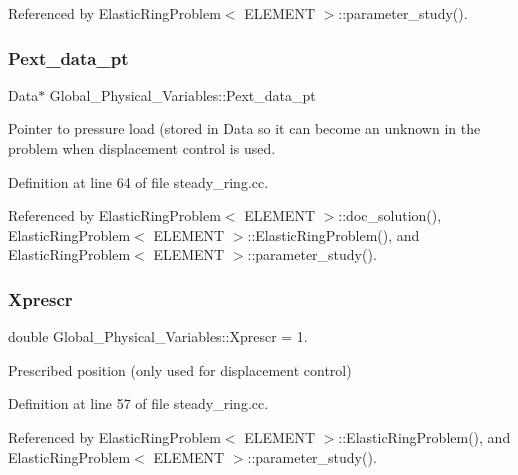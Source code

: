 Referenced by Elastic\+Ring\+Problem$<$ E\+L\+E\+M\+E\+N\+T $>$\+::parameter\+\_\+study().

\mbox{\label{namespaceGlobal__Physical__Variables_a9d598320fb3d7ecf94101088e8f376d2}} 
\subsubsection{\texorpdfstring{Pext\+\_\+data\+\_\+pt}{Pext\_data\_pt}}
{\footnotesize\ttfamily Data$\ast$ Global\+\_\+\+Physical\+\_\+\+Variables\+::\+Pext\+\_\+data\+\_\+pt}



Pointer to pressure load (stored in Data so it can become an unknown in the problem when displacement control is used. 



Definition at line 64 of file steady\+\_\+ring.\+cc.



Referenced by Elastic\+Ring\+Problem$<$ E\+L\+E\+M\+E\+N\+T $>$\+::doc\+\_\+solution(), Elastic\+Ring\+Problem$<$ E\+L\+E\+M\+E\+N\+T $>$\+::\+Elastic\+Ring\+Problem(), and Elastic\+Ring\+Problem$<$ E\+L\+E\+M\+E\+N\+T $>$\+::parameter\+\_\+study().

\mbox{\label{namespaceGlobal__Physical__Variables_a1c774c9cb221df909201e81e84b15f40}} 
\subsubsection{\texorpdfstring{Xprescr}{Xprescr}}
{\footnotesize\ttfamily double Global\+\_\+\+Physical\+\_\+\+Variables\+::\+Xprescr = 1.}



Prescribed position (only used for displacement control) 



Definition at line 57 of file steady\+\_\+ring.\+cc.



Referenced by Elastic\+Ring\+Problem$<$ E\+L\+E\+M\+E\+N\+T $>$\+::\+Elastic\+Ring\+Problem(), and Elastic\+Ring\+Problem$<$ E\+L\+E\+M\+E\+N\+T $>$\+::parameter\+\_\+study().


